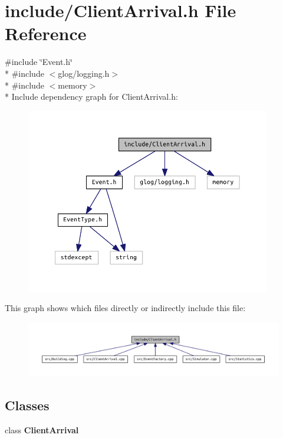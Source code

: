 \section{include/\+Client\+Arrival.h File Reference}
\label{_client_arrival_8h}
{\ttfamily \#include \char`\"{}Event.\+h\char`\"{}}\\*
{\ttfamily \#include $<$glog/logging.\+h$>$}\\*
{\ttfamily \#include $<$memory$>$}\\*
Include dependency graph for Client\+Arrival.\+h\+:
\nopagebreak
\begin{figure}[H]
\begin{center}
\leavevmode
\includegraphics[width=303pt]{_client_arrival_8h__incl}
\end{center}
\end{figure}
This graph shows which files directly or indirectly include this file\+:
\nopagebreak
\begin{figure}[H]
\begin{center}
\leavevmode
\includegraphics[width=350pt]{_client_arrival_8h__dep__incl}
\end{center}
\end{figure}
\subsection*{Classes}
\begin{DoxyCompactItemize}
\item 
class {\bf Client\+Arrival}
\end{DoxyCompactItemize}
